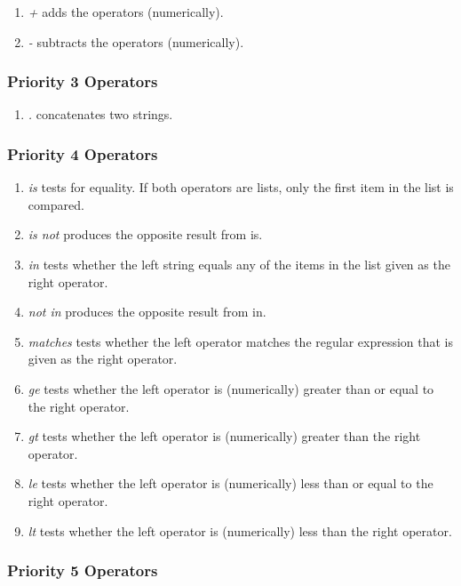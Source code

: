 \begin{enumerate}
\item {\it +} adds the operators (numerically). 
\item {\it -} subtracts the operators (numerically). 
\end{enumerate}


\subsubsection{Priority 3 Operators}

\begin{enumerate}
\item {\it .} concatenates two strings.
\end{enumerate}


\subsubsection{Priority 4 Operators}

\begin{enumerate}
\item {\it is} tests for equality. If both operators are lists, only the 
first item in the list is compared.
\item {\it is not} produces the opposite result from is.
\item {\it in} tests whether the left string equals any of the items in the 
list given as the right operator.
\item {\it not in} produces the opposite result from in.
\item {\it matches} tests whether the left operator matches the regular 
expression that is given as the right operator. 
\item {\it ge} tests whether the left operator is (numerically) greater than 
or equal to the right operator. 
\item {\it gt} tests whether the left operator is (numerically) greater than 
the right operator. 
\item {\it le} tests whether the left operator is (numerically) less than or 
equal to the right operator. 
\item {\it lt} tests whether the left operator is (numerically) less than the 
right operator. 
\end{enumerate}


\subsubsection{Priority 5 Operators}

